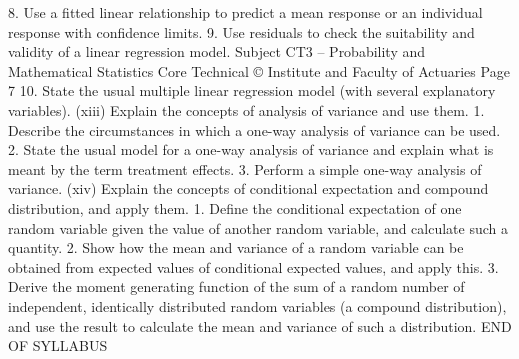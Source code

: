 8. Use a fitted linear relationship to predict a mean response or an individual response with confidence limits.  
 9. Use residuals to check the suitability and validity of a linear regression model. 
 Subject CT3 – Probability and Mathematical Statistics Core Technical  
© Institute and Faculty of Actuaries Page 7 
 10. State the usual multiple linear regression model (with several explanatory variables).  
(xiii) Explain the concepts of analysis of variance and use them.  
1. Describe the circumstances in which a one-way analysis of variance can be used.  
 2. State the usual model for a one-way analysis of variance and explain what is meant by the term treatment effects.  
 3. Perform a simple one-way analysis of variance.  
(xiv) Explain the concepts of conditional expectation and compound distribution, and apply them.  
 1. Define the conditional expectation of one random variable given the value of another random variable, and calculate such a quantity.  
 2. Show how the mean and variance of a random variable can be obtained from expected values of conditional expected values, and apply this.  
 3. Derive the moment generating function of the sum of a random number of independent, identically distributed random variables (a compound distribution), and use the result to calculate the mean and variance of such a distribution.   
END OF SYLLABUS 

